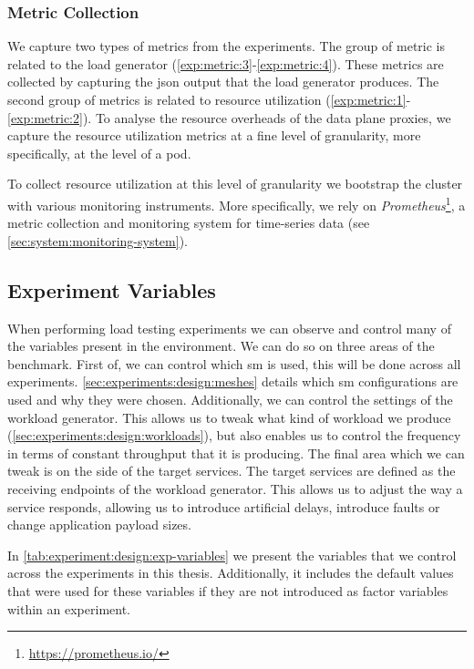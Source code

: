 \subsubsection{Metric Collection}
\label{sec:experiments:design:environment:metric-collection}

We capture two types of metrics from the experiments. The group of metric is related to the load generator (\ref{exp:metric:3}-\ref{exp:metric:4}). These metrics are collected by capturing the \gls{json} output that the load generator produces. The second group of metrics is related to resource utilization (\ref{exp:metric:1}-\ref{exp:metric:2}). To analyse the resource overheads of the data plane proxies, we capture the resource utilization metrics at a fine level of granularity, more specifically, at the level of a \gls{pod}.

To collect resource utilization at this level of granularity we bootstrap the cluster with various monitoring instruments. More specifically, we rely on \textit{Prometheus}\footnote{\url{https://prometheus.io/}}, a metric collection and monitoring system for time-series data (see \cref{sec:system:monitoring-system}).

\subsection{Experiment Variables}
\label{sec:experiments:design:variables}

When performing load testing experiments we can observe and control many of the variables present in the environment. We can do so on three areas of the benchmark. First of, we can control which \gls{sm} is used, this will be done across all experiments. \cref{sec:experiments:design:meshes} details which \gls{sm} configurations are used and why they were chosen. Additionally, we can control the settings of the workload generator. This allows us to tweak what kind of workload we produce (\cref{sec:experiments:design:workloads}), but also enables us to control the frequency in terms of constant throughput that it is producing. The final area which we can tweak is on the side of the target services. The target services are defined as the receiving endpoints of the workload generator. This allows us to adjust the way a service responds, allowing us to introduce artificial delays, introduce faults or change application payload sizes.



In \cref{tab:experiment:design:exp-variables} we present the variables that we control across the experiments in this thesis. Additionally, it includes the default values that were used for these variables if they are not introduced as factor variables within an experiment.

